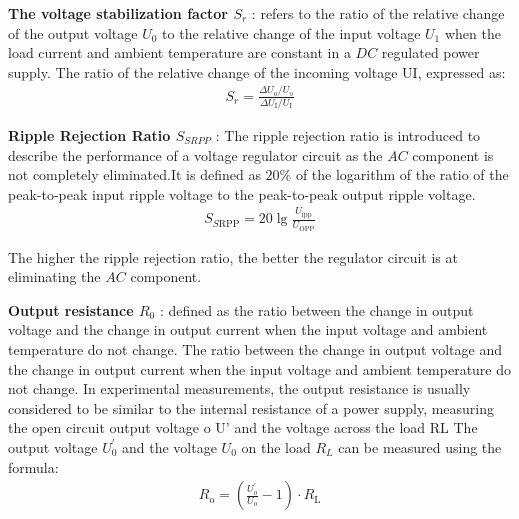 \documentclass[UTF8]{article}
\begin{document}
    \textbf{The voltage stabilization factor $S_r$} : refers to the ratio of the relative change of the output voltage $U_0$ to the relative change of the input voltage $U_1$ when the load current and ambient temperature are constant in a $DC$ regulated power supply. The ratio of the relative change of the incoming voltage UI, expressed as:
    \begin{eqnarray}
    S_{r}=\frac{\Delta U_{\mathrm{o}} / U_{\mathrm{o}}}{\Delta U_{\mathrm{I}} / U_{\mathrm{I}}}
    \end{eqnarray}
    
    \textbf{Ripple Rejection Ratio $S_{SRPP}$} : The ripple rejection ratio is introduced to describe the performance of a voltage regulator circuit as the $AC$ component is not completely eliminated.It is defined as $20 \%$ of the logarithm of the ratio of the peak-to-peak input ripple voltage to the peak-to-peak output ripple voltage.
    \begin{eqnarray}
    S_{S \mathrm{RPP}}=20 \lg \frac{U_{\mathrm{ipp}}}{U_{\mathrm{OPP}}}
    \end{eqnarray}
    
    The higher the ripple rejection ratio, the better the regulator circuit is at eliminating the $AC$ component.
    
   \textbf{ Output resistance $R_0$} : defined as the ratio between the change in output voltage and the change in output current when the input voltage and ambient temperature do not change. The ratio between the change in output voltage and the change in output current when the input voltage and ambient temperature do not change. In experimental measurements, the output resistance is usually considered to be similar to the internal resistance of a power supply, measuring the open circuit output voltage o U' and the voltage across the load RL The output voltage $U_{0}^{'}$ and the voltage $U_0$ on the load $R_L$ can be measured using the formula:
   \begin{eqnarray}
   R_{\mathrm{o}}=\left(\frac{U_{o}^{\prime}}{U_{o}}-1\right) \cdot R_{\mathrm{L}}
   \end{eqnarray}
               
\end{document}

